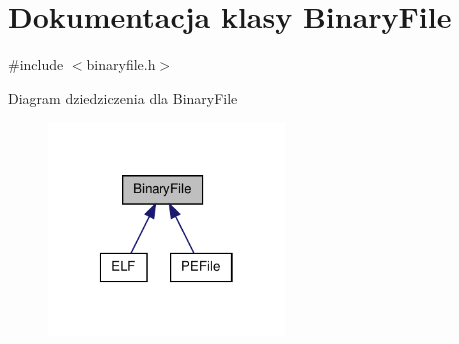\hypertarget{class_binary_file}{\section{Dokumentacja klasy Binary\-File}
\label{class_binary_file}
}


{\ttfamily \#include $<$binaryfile.\-h$>$}



Diagram dziedziczenia dla Binary\-File\nopagebreak
\begin{figure}[H]
\begin{center}
\leavevmode
\includegraphics[width=178pt]{class_binary_file__inherit__graph}
\end{center}
\end{figure}

